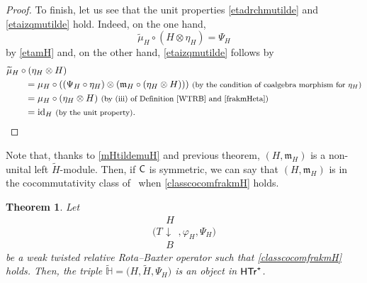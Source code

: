 \documentclass[pdftex]{sigma}
\numberwithin{equation}{section}
\newtheorem{Theorem}{Theorem}[section]
\begin{document}
\begin{proof}
To finish, let us see that the unit properties \eqref{etadrchmutilde} and \eqref{etaizqmutilde} hold. Indeed, on the one hand,
\[
\widetilde{\mu}_{H}\circ(H\otimes\eta_{H})=\Psi_{H}
\]
by \eqref{etamH} and, on the other hand, \eqref{etaizqmutilde} follows by
\begin{align*}
&\widetilde{\mu}_{H}\circ(\eta_{H}\otimes H)\\
&\qquad{}=\mu_{H}\circ((\Psi_{H}\circ\eta_{H})\otimes(\mathfrak{m}_{H}\circ(\eta_{H}\otimes H)))\ \text{\footnotesize\textnormal{(by the condition of coalgebra morphism for $\eta_{H}$)}}\\
&\qquad{}=\mu_{H}\circ(\eta_{H}\otimes H)\ \text{\footnotesize\textnormal{(by (iii) of Definition \ref{WTRB} and \eqref{frakmHeta})}}\\
&\qquad{}={\rm id}_{H}\ \text{\footnotesize\textnormal{(by the unit property)}}.\tag*{\qed}
\end{align*}
\renewcommand{\qed}{}
\end{proof}

\begin{Remark}
Note that, thanks to \eqref{mHtildemuH} and previous theorem, $(H,\mathfrak{m}_{H})$ is a non-unital left $\widetilde{H}$-module. Then, if ${\sf C}$ is symmetric, we can say that $(H,\mathfrak{m}_{H})$ is in the cocommutativity class of~ when \eqref{classcocomfrakmH} holds.
\end{Remark}

\begin{Theorem}\label{funOmega}
Let
\[
\Biggl(T\begin{array}{c}H\\\downarrow\\B\end{array},\varphi_{H},\Psi_{H}\Biggr)
\]
 be a weak twisted relative Rota--Baxter operator such that \eqref{classcocomfrakmH} holds. Then, the triple $\widetilde{\mathbb{H}}=\bigl(H,\widetilde{H},\Psi_{H}\bigr)$ is an object in $\sf{HTr}^{\star}$.
\end{Theorem}
\end{document}
